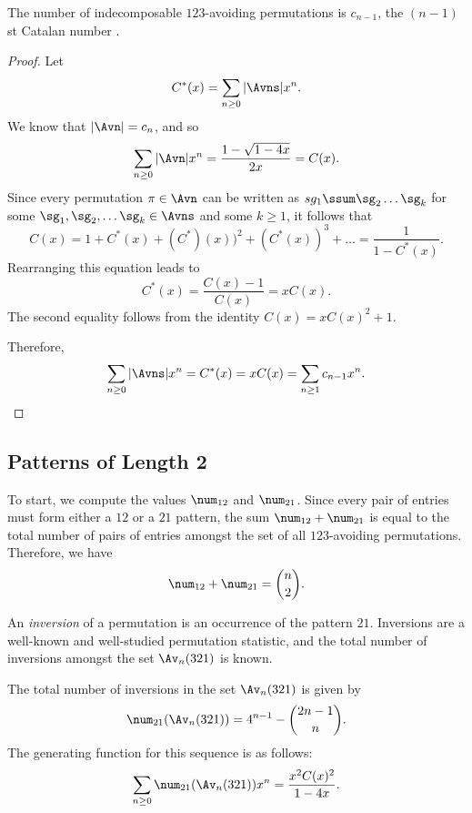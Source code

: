 \documentclass[12pt,twoside]{memoir}
\begin{document}
      \begin{proposition} \label{expat:prop:indecomposable}

        The number of indecomposable $123$-avoiding permutations is $c_{n-1}$, the
        $(n-1)$st Catalan number .
      \end{proposition}
      \begin{proof}
        Let 
        $$ C^*(x) = \sum_{n \geq 0} |\Avns| x^n.$$
        We know that $|\Avn| = c_n$, and so 
        $$ \sum_{n \geq 0} |\Avn| x^n = \frac{1 - \sqrt{1-4x}}{2x} = C(x).$$
        Since every permutation $\pi \in \Avn$ can be written as $sg_1 \ssum \sg_2
        \dots \sg_k$ for some $\sg_1, \sg_2, \dots \sg_k \in \Avns$ and some $k
        \geq 1$, it follows that 
        $$ C(x) = 1 + C^*(x) + (C^*)(x))^2 + (C^*(x))^3 + \dots 
          = \frac{1}{1 - C^*(x)}.$$
        Rearranging this equation leads to 
        $$ C^*(x) = \frac{C(x) - 1}{C(x)} = xC(x).$$
        The second equality follows from the identity $C(x) = xC(x)^2 + 1$. 

        Therefore, 
        $$ \sum_{n \geq 0} |\Avns|x^n = C^*(x) = xC(x) = \sum_{n \geq 1}
        c_{n-1}x^n.$$
      \end{proof}
        

    \subsection{Patterns of Length 2}  

      To start, we compute the values $\num_{12}$ and $\num_{21}$. Since every pair
      of entries must form either a $12$ or a $21$ pattern, the sum $\num_{12} +
      \num_{21}$ is equal to the total number of pairs of entries amongst the set
      of all $123$-avoiding permutations. Therefore, we have 
      $$ \num_{12} + \num_{21} = \binom{n}{2}.$$

      An \emph{inversion}  of a permutation is an occurrence
      of the pattern $21$. Inversions are a well-known and well-studied
      permutation statistic, and the total number of inversions amongst the set
      $\Av_n(321)$ is known. 

      \begin{theorem} 
        The total number of inversions in the set $\Av_n(321)$ is given by 
        $$ \num_{21}(\Av_n(321)) = 4^{n-1} - \binom{2n - 1}{n}.$$
        The generating function for this sequence is as follows:
        $$ \sum_{n \geq 0} \num_{21}(\Av_n(321)) x^n = 
          \frac{x^2 C(x)^2}{1 - 4x}.$$
      \end{theorem}
\end{document}
